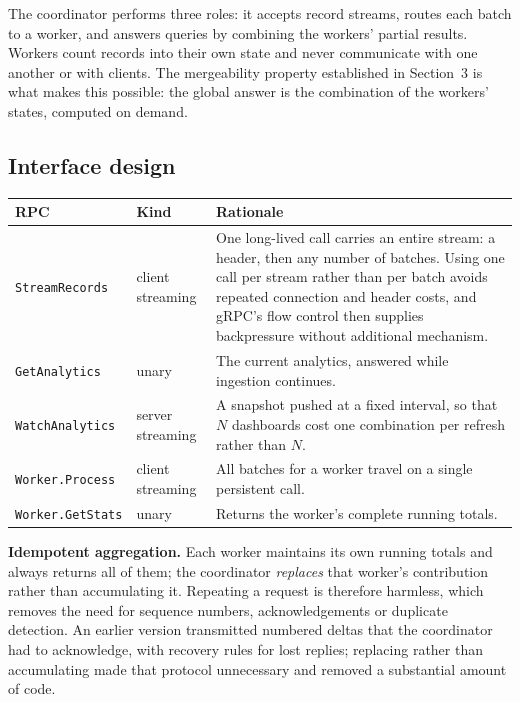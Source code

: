 \documentclass[11pt,a4paper]{article}
\begin{document}
The coordinator performs three roles: it accepts record streams, routes each batch to a
worker, and answers queries by combining the workers' partial results. Workers count
records into their own state and never communicate with one another or with clients.
The mergeability property established in Section~3 is what makes this possible: the
global answer is the combination of the workers' states, computed on demand.

\subsection{Interface design}
\begin{center}\small
\begin{tabular}{@{}llp{8.1cm}@{}}
\toprule
\textbf{RPC} & \textbf{Kind} & \textbf{Rationale} \\
\midrule
\texttt{StreamRecords} & client streaming & One long-lived call carries an entire
stream: a header, then any number of batches. Using one call per stream rather than per
batch avoids repeated connection and header costs, and gRPC's flow control then supplies
backpressure without additional mechanism. \\
\texttt{GetAnalytics} & unary & The current analytics, answered while ingestion
continues. \\
\texttt{WatchAnalytics} & server streaming & A snapshot pushed at a fixed interval, so
that $N$ dashboards cost one combination per refresh rather than $N$. \\
\texttt{Worker.Process} & client streaming & All batches for a worker travel on a single
persistent call. \\
\texttt{Worker.GetStats} & unary & Returns the worker's complete running totals. \\
\bottomrule
\end{tabular}
\end{center}

\textbf{Idempotent aggregation.} Each worker maintains its own running totals and always
returns all of them; the coordinator \emph{replaces} that worker's contribution rather
than accumulating it. Repeating a request is therefore harmless, which removes the need
for sequence numbers, acknowledgements or duplicate detection. An earlier version
transmitted numbered deltas that the coordinator had to acknowledge, with recovery rules
for lost replies; replacing rather than accumulating made that protocol unnecessary and
removed a substantial amount of code.
\end{document}
